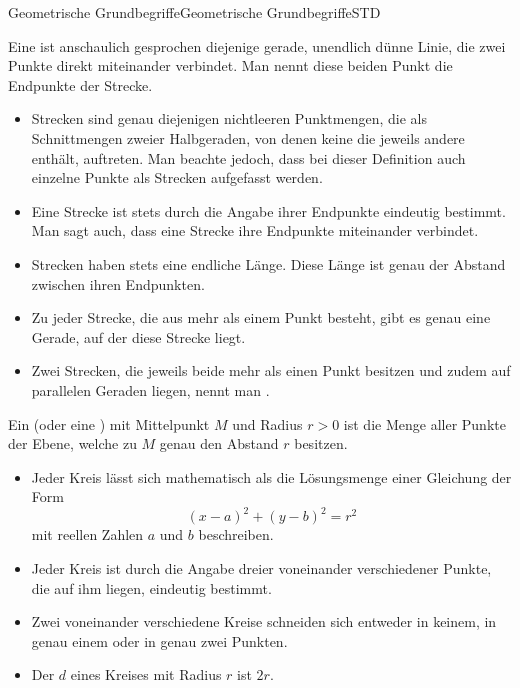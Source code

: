 \begin{MXContent}{Geometrische Grundbegriffe}{Geometrische Grundbegriffe}{STD}

\begin{MInfo}
Eine  ist anschaulich gesprochen diejenige gerade, unendlich d\"unne Linie, die zwei Punkte direkt miteinander verbindet. Man nennt diese beiden Punkt die Endpunkte der Strecke.
\begin{itemize}
 \item Strecken sind genau diejenigen nichtleeren Punktmengen, die als Schnittmengen zweier Halbgeraden, von denen keine die jeweils andere enth\"alt, auftreten. Man beachte jedoch, dass bei dieser Definition auch einzelne Punkte als Strecken aufgefasst werden.
\item Eine Strecke ist stets durch die Angabe ihrer Endpunkte eindeutig bestimmt. Man sagt auch, dass eine Strecke ihre Endpunkte miteinander verbindet.
 \item Strecken haben stets eine endliche L\"ange. Diese L\"ange ist genau der Abstand zwischen ihren Endpunkten.
 \item Zu jeder Strecke, die aus mehr als einem Punkt besteht, gibt es genau eine Gerade, auf der diese Strecke liegt.
\item Zwei Strecken, die jeweils beide mehr als einen Punkt besitzen und zudem auf parallelen Geraden liegen, nennt man .
\end{itemize}
\end{MInfo}  



\begin{MInfo}
Ein  (oder eine ) mit Mittelpunkt $M$ und Radius $r>0$ ist die Menge aller Punkte der Ebene, welche zu $M$ genau den Abstand $r$ besitzen.
\begin{itemize}
\item Jeder Kreis l\"asst sich mathematisch als die L\"osungsmenge einer Gleichung der Form $$(x-a)^2+(y-b)^2=r^2$$ mit reellen Zahlen $a$ und $b$ beschreiben.
 \item Jeder Kreis ist durch die Angabe dreier voneinander verschiedener Punkte, die auf ihm liegen, eindeutig bestimmt.
\item Zwei voneinander verschiedene Kreise schneiden sich entweder in keinem, in genau einem oder in genau zwei Punkten.
 \item Der  $d$ eines Kreises mit Radius $r$ ist $2r$.
\end{itemize}
\end{MInfo}  
\end{MXContent}

